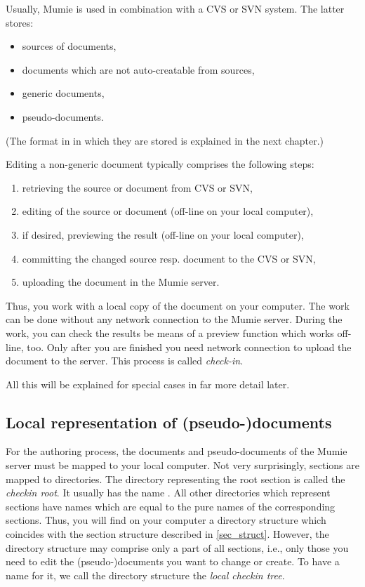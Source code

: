 \documentclass{generic}
\begin{document}
Usually, Mumie is used in combination with a CVS or SVN system. The latter
stores:

\begin{itemize}
\item sources of documents,
\item documents which are not auto-creatable from sources,
\item generic documents,
\item pseudo-documents.
\end{itemize}

(The format in in which they are stored is explained in the next chapter.)

Editing a non-generic document typically comprises the following steps:

\begin{enumerate}
\item retrieving the source or document from CVS or SVN,
\item editing of the source or document (off-line on your local computer),
\item if desired, previewing the result (off-line on your local computer),
\item committing the changed source resp. document to the CVS or SVN,
\item uploading the document in the Mumie server.
\end{enumerate}

Thus, you work with a local copy of the document on your computer. The work can
be done without any network connection to the Mumie server. During the work,
you can check the results be means of a preview function which works off-line,
too. Only after you are finished you need network connection to upload the
document to the server. This process is called \emph{check-in}.

All this will be explained for special cases in far more detail later.

\subsection{Local representation of (pseudo-)documents}\label{local_repr}

For the authoring process, the documents and pseudo-documents of the Mumie
server must be mapped to your local computer. Not very surprisingly, sections
are mapped to directories. The directory representing the root section is
called the \emph{checkin root}. It usually has the name . All
other directories which represent sections have names which are equal to the
pure names of the corresponding sections. Thus, you will find on your computer
a directory structure which coincides with the section structure described in
\ref{sec_struct}. However, the directory structure may comprise only a part of
all sections, i.e., only those you need to edit the (pseudo-)documents you want
to change or create. To have a name for it, we call the directory structure the
\emph{local checkin tree}.
\end{document}
